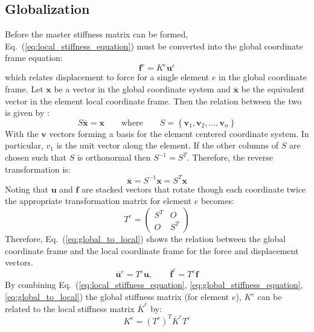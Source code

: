 \documentclass{article}
\begin{document}
\subsection{Globalization}

Before the master stiffness matrix can be formed,
Eq.~(\ref{eq:local_stiffness_equation}) must be converted into the global
coordinate frame equation:
\begin{equation}
    \mathbf{f}^e=K^e\mathbf{u}^e\label{eq:global_stiffness_equation}
\end{equation}
which relates displacement to force for a single element $e$ in the global
coordinate frame.  Let $\mathbf{x}$ be a vector in the global coordinate
system and $\overline{\mathbf{x}}$ be the equivalent vector in the element
local coordinate frame.  Then the relation between the two is given by
\parencite{olver2006}:
\begin{equation}
    S\overline{\mathbf{x}}=\mathbf{x}\qquad\text{where}\qquad
    S=\left\{\mathbf{v}_1,\mathbf{v}_2,\ldots,\mathbf{v}_n\right\}
\end{equation}
With the $\mathbf{v}$ vectors forming a basis for the element centered
coordinate system.  In particular, $v_1$ is the unit vector along the element.
If the other columns of $S$ are chosen such that $S$ is orthonormal then
$S^{-1}=S^{T}$.  Therefore, the reverse transformation is:
\begin{equation}
    \overline{\mathbf{x}}=S^{-1}\mathbf{x}=S^T\mathbf{x}
\end{equation}
Noting that $\mathbf{u}$ and $\mathbf{f}$ are stacked vectors that rotate
though each coordinate twice the appropriate transformation matrix for element
$e$ becomes:
\begin{equation}
    T^e=\begin{pmatrix}
        S^T&O\\O&S^T
    \end{pmatrix}
\end{equation}
Therefore, Eq.~(\ref{eq:global_to_local}) shows the relation between the
global coordinate frame and the local coordinate frame for the force and
displacement vectors.
\begin{equation}
    \overline{\mathbf{u}}^e=T^e\mathbf{u},\qquad
    \overline{\mathbf{f}}^e=T^e\mathbf{f}
    \label{eq:global_to_local}
\end{equation}
By combining Eq.~(\ref{eq:local_stiffness_equation},
\ref{eq:global_stiffness_equation}, \ref{eq:global_to_local}) the global
stiffness matrix (for element $e$), $K^e$ can be related to the local
stiffness matrix $\overline{K}^e$ by:
\begin{equation}
    K^e=(T^e)^T\overline{K}^eT^e
\end{equation}
\end{document}
